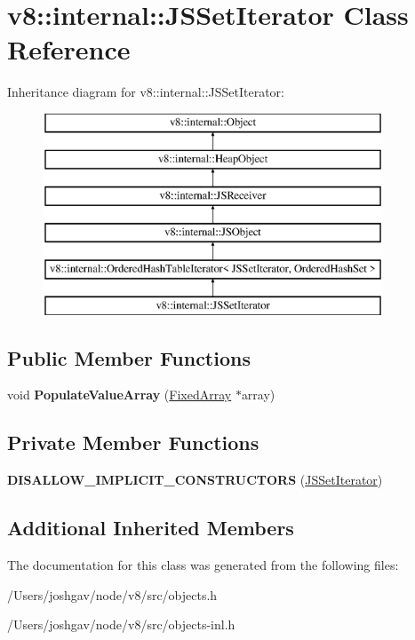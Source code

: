 \hypertarget{classv8_1_1internal_1_1_j_s_set_iterator}{}\section{v8\+:\+:internal\+:\+:J\+S\+Set\+Iterator Class Reference}
\label{classv8_1_1internal_1_1_j_s_set_iterator}
Inheritance diagram for v8\+:\+:internal\+:\+:J\+S\+Set\+Iterator\+:\begin{figure}[H]
\begin{center}
\leavevmode
\includegraphics[height=6.000000cm]{classv8_1_1internal_1_1_j_s_set_iterator}
\end{center}
\end{figure}
\subsection*{Public Member Functions}
\begin{DoxyCompactItemize}
\item 
void {\bfseries Populate\+Value\+Array} (\hyperlink{classv8_1_1internal_1_1_fixed_array}{Fixed\+Array} $\ast$array)\hypertarget{classv8_1_1internal_1_1_j_s_set_iterator_a39aa2ea726cbf6da8d5c1f61d6b288b5}{}\label{classv8_1_1internal_1_1_j_s_set_iterator_a39aa2ea726cbf6da8d5c1f61d6b288b5}

\end{DoxyCompactItemize}
\subsection*{Private Member Functions}
\begin{DoxyCompactItemize}
\item 
{\bfseries D\+I\+S\+A\+L\+L\+O\+W\+\_\+\+I\+M\+P\+L\+I\+C\+I\+T\+\_\+\+C\+O\+N\+S\+T\+R\+U\+C\+T\+O\+RS} (\hyperlink{classv8_1_1internal_1_1_j_s_set_iterator}{J\+S\+Set\+Iterator})\hypertarget{classv8_1_1internal_1_1_j_s_set_iterator_a98b493804a963dab6b54567aedc756b3}{}\label{classv8_1_1internal_1_1_j_s_set_iterator_a98b493804a963dab6b54567aedc756b3}

\end{DoxyCompactItemize}
\subsection*{Additional Inherited Members}


The documentation for this class was generated from the following files\+:\begin{DoxyCompactItemize}
\item 
/\+Users/joshgav/node/v8/src/objects.\+h\item 
/\+Users/joshgav/node/v8/src/objects-\/inl.\+h\end{DoxyCompactItemize}
